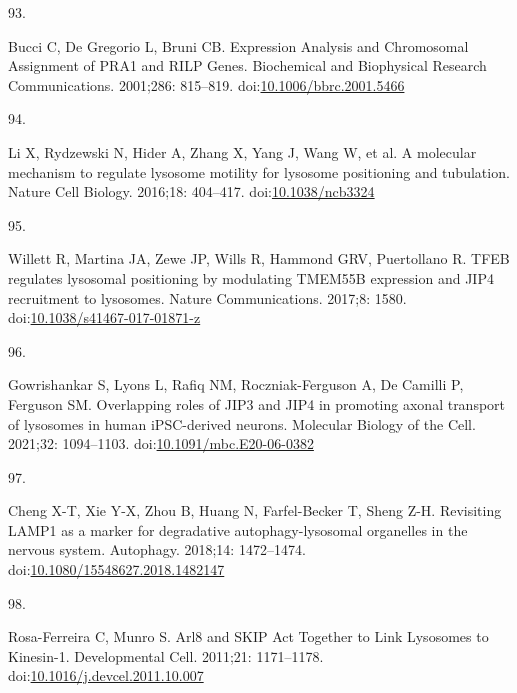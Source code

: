 \documentclass[
  12pt,
  a4paper,
]{book}
\newlength{\cslhangindent}
\newlength{\csllabelwidth}
\newlength{\cslentryspacingunit} %
\newenvironment{CSLReferences}[2] %
 {%
  \setlength{\parindent}{0pt}
  \ifodd #1
  \let\oldpar\par
  \def\par{\hangindent=\cslhangindent\oldpar}
  \fi
  \setlength{\parskip}{#2\cslentryspacingunit}
 }%
 {}
\newcommand{\CSLLeftMargin}[1]{\parbox[t]{\csllabelwidth}{#1}}
\newcommand{\CSLRightInline}[1]{\parbox[t]{\linewidth - \csllabelwidth}{#1}\break}
\begin{document}
\begin{CSLReferences}{0}{0}
\leavevmode{}%
\CSLLeftMargin{93. }%
\CSLRightInline{Bucci C, De Gregorio L, Bruni CB. Expression {Analysis} and {Chromosomal Assignment} of {PRA1} and {RILP Genes}. Biochemical and Biophysical Research Communications. 2001;286: 815--819. doi:\href{https://doi.org/10.1006/bbrc.2001.5466}{10.1006/bbrc.2001.5466}}

\leavevmode{}%
\CSLLeftMargin{94. }%
\CSLRightInline{Li X, Rydzewski N, Hider A, Zhang X, Yang J, Wang W, et al. A molecular mechanism to regulate lysosome motility for lysosome positioning and tubulation. Nature Cell Biology. 2016;18: 404--417. doi:\href{https://doi.org/10.1038/ncb3324}{10.1038/ncb3324}}

\leavevmode{}%
\CSLLeftMargin{95. }%
\CSLRightInline{Willett R, Martina JA, Zewe JP, Wills R, Hammond GRV, Puertollano R. {TFEB} regulates lysosomal positioning by modulating {TMEM55B} expression and {JIP4} recruitment to lysosomes. Nature Communications. 2017;8: 1580. doi:\href{https://doi.org/10.1038/s41467-017-01871-z}{10.1038/s41467-017-01871-z}}

\leavevmode{}%
\CSLLeftMargin{96. }%
\CSLRightInline{Gowrishankar S, Lyons L, Rafiq NM, Roczniak-Ferguson A, De Camilli P, Ferguson SM. Overlapping roles of {JIP3} and {JIP4} in promoting axonal transport of lysosomes in human {iPSC-derived} neurons. Molecular Biology of the Cell. 2021;32: 1094--1103. doi:\href{https://doi.org/10.1091/mbc.E20-06-0382}{10.1091/mbc.E20-06-0382}}

\leavevmode{}%
\CSLLeftMargin{97. }%
\CSLRightInline{Cheng X-T, Xie Y-X, Zhou B, Huang N, Farfel-Becker T, Sheng Z-H. Revisiting {LAMP1} as a marker for degradative autophagy-lysosomal organelles in the nervous system. Autophagy. 2018;14: 1472--1474. doi:\href{https://doi.org/10.1080/15548627.2018.1482147}{10.1080/15548627.2018.1482147}}

\leavevmode{}%
\CSLLeftMargin{98. }%
\CSLRightInline{Rosa-Ferreira C, Munro S. Arl8 and {SKIP Act Together} to {Link Lysosomes} to {Kinesin-1}. Developmental Cell. 2011;21: 1171--1178. doi:\href{https://doi.org/10.1016/j.devcel.2011.10.007}{10.1016/j.devcel.2011.10.007}}


\end{CSLReferences}
\end{document}
